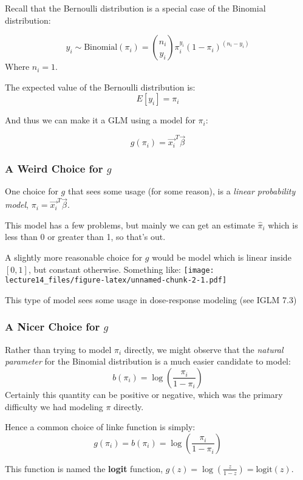 \documentclass[
]{article}
\begin{document}
Recall that the Bernoulli distribution is a special case of the Binomial
distribution:

\[
y_i \sim \text{Binomial}(\pi_i) = {n_i \choose y_i } \pi_i^{y_i} (1-\pi_i)^{(n_i-y_i)}
\] Where \(n_i=1\).

The expected value of the Bernoulli distribution is: \[
E[y_i] = \pi_i
\]

And thus we can make it a GLM using a model for \(\pi_i\):

\[
g(\pi_i) = \vec{x_i}^T\vec{\beta}
\]

\hypertarget{a-weird-choice-for-g}{%
\subsubsection{\texorpdfstring{A Weird Choice for
\(g\)}{A Weird Choice for g}}\label{a-weird-choice-for-g}}

One choice for \(g\) that sees some usage (for some reason), is a
\emph{linear probability model}, \(\pi_i= \vec{x_i}^T\vec{\beta}\).

This model has a few problems, but mainly we can get an estimate
\(\hat{\pi}_i\) which is less than 0 or greater than 1, so that's out.

A slightly more reasonable choice for \(g\) would be model which is
linear inside \([0,1]\), but constant otherwise. Something like:
\texttt{[image: lecture14\_files/figure-latex/unnamed-chunk-2-1.pdf]}

This type of model sees some usage in dose-response modeling (see IGLM
7.3)

\hypertarget{a-nicer-choice-for-g}{%
\subsubsection{\texorpdfstring{A Nicer Choice for
\(g\)}{A Nicer Choice for g}}\label{a-nicer-choice-for-g}}

Rather than trying to model \(\pi_i\) directly, we might observe that
the \emph{natural parameter} for the Binomial distribution is a much
easier candidate to model: \[
b(\pi_i) = \log{\left( \frac{\pi_i}{1-\pi_i} \right)}
\] Certainly this quantity can be positive or negative, which was the
primary difficulty we had modeling \(\pi\) directly.

Hence a common choice of linke function is simply: \[
g(\pi_i) = b(\pi_i) = \log{\left( \frac{\pi_i}{1-\pi_i} \right)}
\]

This function is named the \textbf{logit} function,
\(g(z) = \log{\left( \frac{z}{1-z} \right)} = \text{logit}(z)\).
\end{document}
